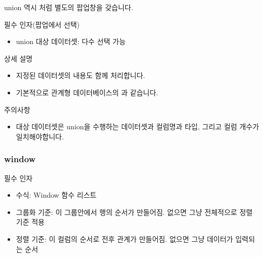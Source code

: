 \documentclass[letterpaper,10pt,english]{sphinxmanual}
\begin{document}
union 역시 {\hyperref[\detokenize{discovery/part07/rule_kinds:join}]{}}처럼 별도의 팝업창을 갖습니다.

필수 인자(팝업에서 선택)
\begin{itemize}
\item {} 
union 대상 데이터셋: 다수 선택 가능

\end{itemize}

상세 설명
\begin{itemize}
\item {} 
지정된 데이터셋의 내용도 함께 처리합니다.

\item {} 
기본적으로 관계형 데이터베이스의 과 같습니다.

\end{itemize}

주의사항
\begin{itemize}
\item {} 
대상 데이터셋은 union을 수행하는 데이터셋과 컬럼명과 타입, 그리고 컬럼 개수가 일치해야합니다.
\begin{quote}

\begin{figure}[H]
\centering

\noindent{}
\end{figure}
\end{quote}

\end{itemize}


\subsubsection{window}
\label{\detokenize{discovery/part07/rule_kinds:window}}
\begin{figure}[H]
\centering

\noindent{}
\end{figure}

\begin{figure}[H]
\centering

\noindent{}
\end{figure}

필수 인자
\begin{itemize}
\item {} 
수식: Window 함수 리스트

\item {} 
그룹화 기준: 이 그룹안에서 행의 순서가 만들어짐. 없으면 그냥 전체적으로 정렬 기준 적용

\item {} 
정렬 기준: 이 컬럼의 순서로 전후 관계가 만들어짐. 없으면 그냥 데이터가 입력되는 순서

\end{itemize}
\end{document}
